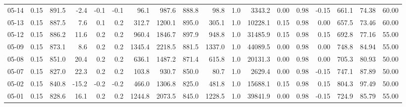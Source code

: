 \begin{threeparttable}
{\begin{tabular}{lrrrrrrrrrrrrrrrrr}
  05-14 &     0.15 & 891.5 &              -2.4 &              -0.1 &               -0.1 &               96.1 &   987.6 & 888.8 &       98.8 &                      1.0 &              3343.2 &       0.00 &      0.98 &          -0.15 &            661.1 &           74.38 &                  60.00 \\
  05-13 &     0.15 & 887.5 &               7.6 &               0.1 &                0.2 &              312.7 &  1200.1 & 895.0 &      305.1 &                      1.0 &             10228.1 &       0.15 &      0.98 &           0.00 &            657.5 &           73.46 &                  60.00 \\
  05-12 &     0.15 & 886.2 &              11.6 &               0.2 &                0.2 &              960.4 &  1846.7 & 897.9 &      948.8 &                      1.0 &             31485.9 &       0.15 &      0.98 &           0.15 &            692.8 &           77.16 &                  55.00 \\
  05-09 &     0.15 & 873.1 &               8.6 &               0.2 &                0.2 &             1345.4 &  2218.5 & 881.5 &     1337.0 &                      1.0 &             44089.5 &       0.00 &      0.98 &           0.00 &            748.8 &           84.94 &                  55.00 \\
  05-08 &     0.15 & 851.0 &              20.4 &               0.2 &                0.2 &              636.1 &  1487.2 & 871.4 &      615.8 &                      1.0 &             20131.3 &       0.00 &      0.98 &           0.00 &            705.3 &           80.93 &                  50.00 \\
  05-07 &     0.15 & 827.0 &              22.3 &               0.2 &                0.2 &              103.8 &   930.7 & 850.0 &       80.7 &                      1.0 &              2629.4 &       0.00 &      0.98 &          -0.15 &            747.1 &           87.89 &                  50.00 \\
  05-02 &     0.15 & 840.8 &             -15.2 &              -0.2 &               -0.2 &              466.0 &  1306.8 & 825.0 &      481.8 &                      1.0 &             15688.1 &       0.15 &      0.98 &           0.15 &            804.3 &           97.49 &                  50.00 \\
  05-01 &     0.15 & 828.6 &              16.1 &               0.2 &                0.2 &             1244.8 &  2073.5 & 845.0 &     1228.5 &                      1.0 &             39841.9 &       0.00 &      0.98 &          -0.15 &            724.9 &           85.79 &                  55.00 \\

\end{tabular}}
\end{threeparttable}
